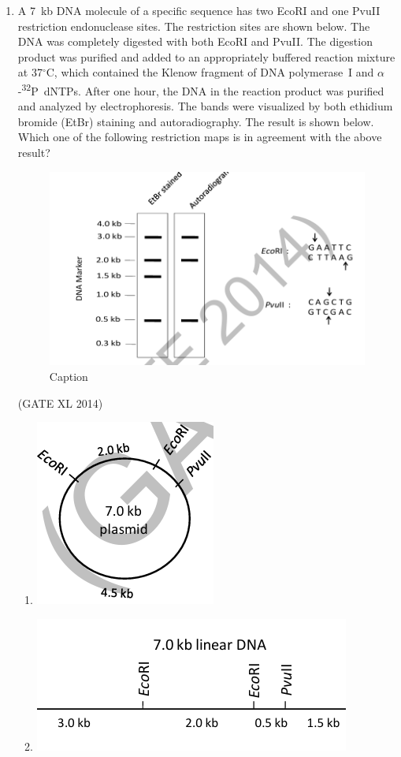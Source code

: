 \documentclass[journal,12pt,onecolumn]{IEEEtran}
\theoremstyle{remark}
\begin{document}
\begin{enumerate}
\item A 7~kb DNA molecule of a specific sequence has two EcoRI and one PvuII restriction endonuclease sites. The restriction sites are shown below. The DNA was completely digested with both EcoRI and PvuII. The digestion product was purified and added to an appropriately buffered reaction mixture at 37$^\circ$C, which contained the Klenow fragment of DNA polymerase~I and $\alpha$-\textsuperscript{32}P~dNTPs. After one hour, the DNA in the reaction product was purified and analyzed by electrophoresis. The bands were visualized by both ethidium bromide (EtBr) staining and autoradiography. The result is shown below. Which one of the following restriction maps is in agreement with the above result?
\begin{figure}[H]
    \centering
    \includegraphics[width=0.5\columnwidth]{fig28.png}
    \caption{Caption}
    \label{fig:placeholder}
\end{figure}
\hfill (GATE XL 2014)\\
\begin{multicols}{2}
\begin{enumerate}
\item \includegraphics[width=0.4\columnwidth]{fig29.png}
\item \includegraphics[width=0.5\columnwidth]{fig30.png}

\end{enumerate}
\end{multicols}
\end{enumerate}
\end{document}
